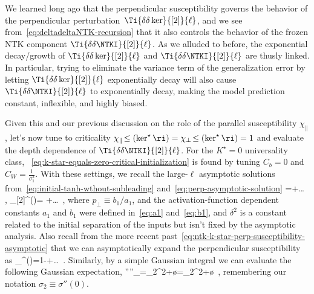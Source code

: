 We learned long ago that the perpendicular susceptibility governs the behavior of the perpendicular perturbation~$\Ti{\delta\delta\ker}{[2]}{\ell}$, and we see from~\eqref{eq:deltadeltaNTK-recursion} that it also controls the behavior of the frozen NTK component $\Ti{\delta\delta\NTKI}{[2]}{\ell}$. As we alluded to before, the exponential decay/growth of $\Ti{\delta\delta\ker}{[2]}{\ell}$ and $\Ti{\delta\delta\NTKI}{[2]}{\ell}$ are thusly linked. In particular, trying to eliminate the variance term of the generalization error by letting $\Ti{\delta\delta\ker}{[2]}{\ell}$ exponentially decay will also cause $\Ti{\delta\delta\NTKI}{[2]}{\ell}$ to exponentially decay, making the model prediction constant, inflexible, and highly biased.

Given this and our previous discussion on the role of the parallel susceptibility $\chi_{\parallel}$, 
let's now tune to criticality $\chi_{\parallel}\!\le(\ker^\star\ri)=\chi_\perp\!\le(\ker^\star\ri) =1$ and evaluate the depth dependence of $\Ti{\delta\delta\NTKI}{[2]}{\ell}$. For the $K^\star=0$ universality class, ~\eqref{eq:k-star-equals-zero-critical-initialization} is found by tuning $C_b=0$ and $C_W=\frac{1}{\sigma_1^2}$. %
With these settings, we recall the large-$\ell$ asymptotic solutions from~\eqref{eq:initial-tanh-wthout-subleading} and~\eqref{eq:perp-asymptotic-solution}
\be\label{eq:perp-asymptotic-solution-reprint}
\KML=\le[\frac{1}{(-a_1)}\ri] +\ldots\, , \qquad \delta\delta \ker_{[2]}^{(\ell)}= +\ldots\,  ,
\ee
where $p_{\perp}\equiv b_1/a_1$, and the activation-function dependent constants $a_1$ and $b_1$ were defined in~\eqref{eq:a1} and~\eqref{eq:b1}, and $\delta^2$ is a constant related to the initial separation of the inputs but isn't fixed by the asymptotic analysis. 
Also recall from the more recent past~\eqref{eq:ntk-k-star-perp-susceptibility-asymptotic} that we can asymptotically expand the perpendicular susceptibility as
\be\label{eq:perp-perp-perp-perp}
\chi_{\perp}^{(\ell)}=1-+\ldots\, .
\ee
Similarly, by a simple Gaussian integral we can evaluate the following Gaussian expectation,
\be\label{eq:deri-deri-deri-deri}
\bra \sigma''\sigma''\ket_{\KML}=\sigma_2^2+\o{\KML}=\sigma_2^2+\o{}\, ,
\ee
remembering our notation $\sigma_2\equiv \sigma''(0)$.


